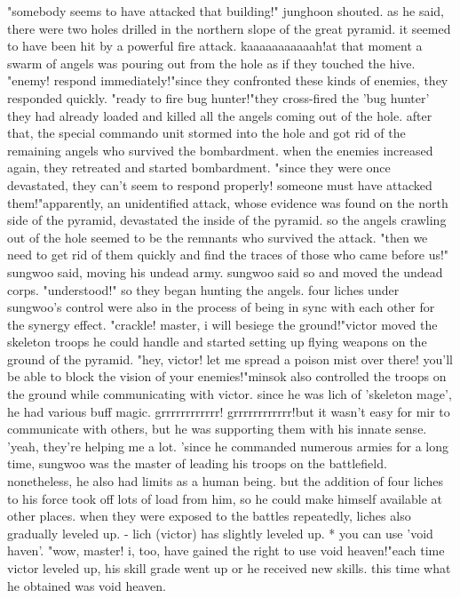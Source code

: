 "somebody seems to have attacked that building!" junghoon shouted.
as he said, there were two holes drilled in the northern slope of the great pyramid.
it seemed to have been hit by a powerful fire attack.
kaaaaaaaaaaah!at that moment a swarm of angels was pouring out from the hole as if they touched the hive.
"enemy! respond immediately!"since they confronted these kinds of enemies, they responded quickly.
"ready to fire bug hunter!"they cross-fired the 'bug hunter' they had already loaded and killed all the angels coming out of the hole.
after that, the special commando unit stormed into the hole and got rid of the remaining angels who survived the bombardment.
 when the enemies increased again, they retreated and started bombardment.
"since they were once devastated, they can't seem to respond properly! someone must have attacked them!"apparently, an unidentified attack, whose evidence was found on the north side of the pyramid, devastated the inside of the pyramid.
so the angels crawling out of the hole seemed to be the remnants who survived the attack.
"then we need to get rid of them quickly and find the traces of those who came before us!" sungwoo said, moving his undead army.
sungwoo said so and moved the undead corps.
"understood!" so they began hunting the angels.
four liches under sungwoo's control were also in the process of being in sync with each other for the synergy effect.
"crackle! master, i will besiege the ground!"victor moved the skeleton troops he could handle and started setting up flying weapons on the ground of the pyramid.
"hey, victor! let me spread a poison mist over there! you'll be able to block the vision of your enemies!"minsok also controlled the troops on the ground while communicating with victor.
 since he was lich of 'skeleton mage', he had various buff magic.
grrrrrrrrrrrr! grrrrrrrrrrrr!but it wasn't easy for mir to communicate with others, but he was supporting them with his innate sense.
'yeah, they're helping me a lot.
'since he commanded numerous armies for a long time, sungwoo was the master of leading his troops on the battlefield.
 nonetheless, he also had limits as a human being.
 but the addition of four liches to his force took off lots of load from him, so he could make himself available at other places.
when they were exposed to the battles repeatedly, liches also gradually leveled up.
- lich (victor) has slightly leveled up.
 * you can use 'void haven'.
"wow, master! i, too, have gained the right to use void heaven!"each time victor leveled up, his skill grade went up or he received new skills.
 this time what he obtained was void heaven.
